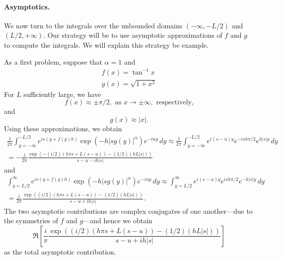\documentclass[11pt,letterpaper]{article}
\begin{document}
\paragraph{Asymptotics.} We now turn to the integrals over the unbounded domains $(-\infty, -L/2)$ and $(L/2, +\infty)$. Our strategy will be to use asymptotic approximations of $f$ and $g$ to compute the integrals. We will explain this strategy be example.

As a first problem, suppose that $\alpha = 1$ and
\begin{gather*}
f(x) = \tan^{-1} x \\
g(x) = \sqrt{1 + x^2}
\end{gather*}
For $L$ sufficiently large, we have
\[
f(x) \approx \pm \pi/2, \text{ as } x \to \pm \infty, \text{ respectively,}
\]
and
\[
g(x) \approx |x|.
\]
Using these approximations, we obtain
\begin{multline*}
\frac{1}{2 \pi} \int_{y=-\infty}^{-L/2} e^{is\left(y+f(y)h\right)}\exp{\left(  -h |s g(y)|^{\alpha} \right)}e^{-iuy}\, dy \approx \frac{1}{2 \pi} \int_{y=-\infty}^{-L/2} e^{i(s-u)y} e^{-i s h \pi/2} e^{h |s| y} \, dy \\
 = - \frac{i}{2 \pi} \frac{\exp \left( - (i/2)(h \pi s + L(s-u)) - (1/2)(h L |s|) \right)}{s - u - i h |s|}
\end{multline*}
and
\begin{multline*}
\int_{y=L/2}^{\infty} e^{is\left(y+f(y)h\right)}\exp{\left(  -h |s g(y)|^{\alpha} \right)}e^{-iuy}\, dy \approx \int_{y=L/2}^{\infty} e^{i(s-u)y} e^{i s h \pi/2} e^{-h |s| y} \, dy \\
 = \frac{i}{2 \pi} \frac{\exp \left( (i/2)(h \pi s + L(s-u)) - (1/2)(h L |s|) \right)}{s - u + i h |s|}.
\end{multline*}
The two asymptotic contributions are complex conjugates of one another---due to the symmetries of $f$ and $g$---and hence we obtain
\begin{equation}
\label{eqn:asympcalc}
\Re \left[ \frac{i}{\pi} \frac{\exp \left( (i/2)(h \pi s + L(s-u)) - (1/2)(h L |s|) \right)}{s - u + i h |s|} \right]
\end{equation}
as the total asymptotic contribution.
\end{document}
